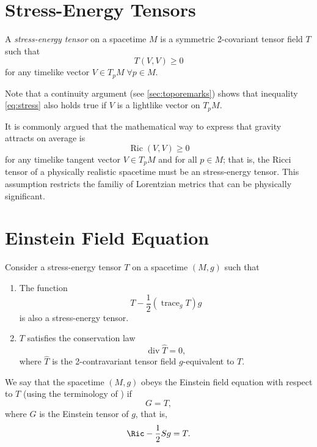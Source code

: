 \section{Stress-Energy Tensors}
\label{sec:stressenergy}

\begin{definition}
	A \emph{stress-energy tensor} on a spacetime $M$ is a symmetric 2-covariant tensor field $T$ such that
	\begin{equation}
	\label{eq:stress}
		T(V,V) \geq 0
	\end{equation}
	for any timelike vector $V \in T_p M \; \forall p \in M$.
\end{definition}

Note that a continuity argument (see \autoref{sec:toporemarks}) shows that inequality \ref{eq:stress} also holds true if $V$ is a lightlike vector on $T_p M$.

It is commonly argued that the mathematical way to express that gravity attracts on average is
\begin{equation}
	\operatorname{Ric} (V,V) \geq 0
\end{equation}
for any timelike tangent vector $V \in T_p M$ and for all $p \in M$; that is, the Ricci tensor of a physically realistic spacetime must be an stress-energy tensor. This assumption restricts the familiy of Lorentzian metrics that can be physically significant.

\section{Einstein Field Equation}

Consider a stress-energy tensor $T$ on a spacetime $(M,g)$ such that
\begin{enumerate}
	\item The function \begin{equation}
		\label{eq:stressderived}
		T - \frac{1}{2}(\operatorname{trace}_g T) g
	\end{equation} is also a stress-energy tensor.
	\item $T$ satisfies the conservation law \begin{equation}
		\label{eq:div0}
		\operatorname{div} \widehat{T} = 0,
	\end{equation}
	where $\widehat{T}$ is the 2-contravariant tensor field $g$-equivalent to $T$.
\end{enumerate}

We say that the spacetime $(M,g)$ obeys the Einstein field equation with respect to $T$ (using the terminology of \cite[Sec. 6.2]{sachswu77}) if
\begin{equation}
	\label{eq:einstein}
	G  = T,
\end{equation}
where $G$ is the Einstein tensor of $g$, that is,
\begin{equation}
	\label{eq:einstein2}
	\Ric - \frac{1}{2}Sg = T.
\end{equation}

